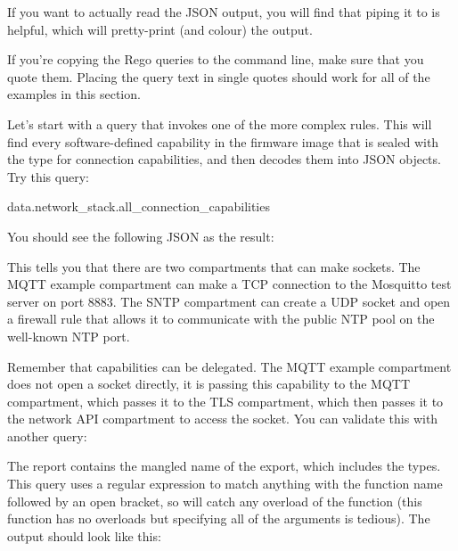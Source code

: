 If you want to actually read the JSON output, you will find that piping it to  is helpful, which will pretty-print (and colour) the output.

\begin{note}
If you're copying the Rego queries to the command line, make sure that you quote them.
Placing the query text in single quotes should work for all of the examples in this section.
\end{note}

Let's start with a query that invokes one of the more complex rules.
This will find every software-defined capability in the firmware image that is sealed with the type for connection capabilities, and then decodes them into JSON objects.
Try this query:

\begin{regosnippet}
data.network_stack.all_connection_capabilities
\end{regosnippet}

You should see the following JSON as the result:

\begin{jsonsnippet}
[
  {
    "capability": {
      "connection_type": "UDP",
      "host": "pool.ntp.org",
      "port": 123
    \},
    "owner": "SNTP"
  \},
  {
    "capability": {
      "connection_type": "TCP",
      "host": "test.mosquitto.org",
      "port": 8883
    \},
    "owner": "mqtt_example"
  \}
]
\end{jsonsnippet}

This tells you that there are two compartments that can make sockets.
The MQTT example compartment can make a TCP connection to the Mosquitto test server on port 8883.
The SNTP compartment can create a UDP socket and open a firewall rule that allows it to communicate with the public NTP pool on the well-known NTP port.

Remember that capabilities can be delegated.
The MQTT example compartment does not open a socket directly, it is passing this capability to the MQTT compartment, which passes it to the TLS compartment, which then passes it to the network API compartment to access the socket.
You can validate this with another query:


The report contains the mangled name of the export, which includes the types.
This query uses a regular expression to match anything with the function name followed by an open bracket, so will catch any overload of the function (this function has no overloads but specifying all of the arguments is tedious).
The output should look like this:


